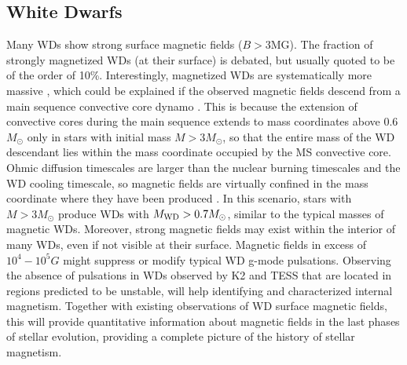 {\color{red} \subsection{White Dwarfs}}
Many WDs show strong surface magnetic fields ($B>$3MG). The fraction of strongly magnetized WDs (at their surface) is debated, but usually quoted to be of the order of 10\%. Interestingly, magnetized WDs are systematically more massive \cite{Ferrario_2015}, which could be explained if the observed magnetic fields descend from a main sequence convective core dynamo \cite{Cantiello_2016}. This is because the extension of convective cores during the main sequence extends to mass coordinates above 0.6$M_\odot$ only in stars with initial mass $M>3M_\odot$, so that the entire mass of the WD descendant lies within the mass coordinate occupied by the MS convective core. Ohmic diffusion timescales are larger than the nuclear burning timescales and the WD cooling timescale, so magnetic fields are virtually confined in the mass coordinate where they have been produced \cite{Cantiello_2016}. In this scenario, stars with $M>3M_\odot$ produce WDs with $M_{\rm WD}>0.7M_\odot$, similar to the typical masses of magnetic WDs. Moreover, strong magnetic fields may exist within the interior of many WDs, even if not visible at their surface. Magnetic fields in excess of $10^4-10^5 G$ might suppress or modify typical WD g-mode pulsations. Observing the absence of pulsations in WDs observed by K2 and TESS that are located in regions predicted to be unstable, will help identifying and characterized internal magnetism. Together with existing observations of WD surface magnetic fields, this will provide quantitative information about magnetic fields in the last phases of stellar evolution,  providing a complete  picture of the history of stellar magnetism.


